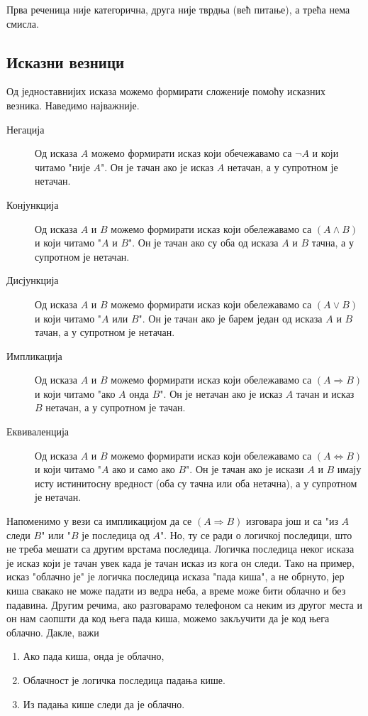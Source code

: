 \documentclass[a4paper]{book}
\begin{document}
Прва реченица није категорична, друга није тврдња (већ питање), а трећа нема смисла.

\subsection{Исказни везници}

\indent

Од једноставнијих исказа можемо формирати сложеније помоћу исказних везника.
На\-ве\-ди\-мо најважније.
\begin{description}
\item[Негација] Од исказа $A$ можемо формирати исказ који обечежавамо са $\lnot A$ и који
читамо "није $A$". Он је тачан ако је исказ $A$ нетачан, а у супротном је нетачан.
\item[Конјункција] Од исказа $A$ и $B$ можемо формирати исказ који обележавамо са $(A\land B)$
и који читамо "$A$ и $B$". Он је тачан ако су оба од исказа $A$ и $B$ тачна, а у супротном је нетачан.
\item[Дисјункција] Од исказа $A$ и $B$ можемо формирати исказ који обележавамо са $(A\lor B)$
и који читамо "$A$ или $B$". Он је тачан ако је барем један од исказа $A$ и $B$ тачан, а у супротном је нетачан.
\item[Импликација] Од исказа $A$ и $B$ можемо формирати исказ који обележавамо са $(A\Rightarrow B)$
и који читамо "ако $A$ онда $B$". Он је нетачан ако је исказ $A$ тачан и исказ $B$ нетачан, а у супротном је тачан.
\item[Еквиваленција] Од исказа $A$ и $B$ можемо формирати исказ који обележавамо са $(A\Leftrightarrow B)$
и који читамо "$A$ ако и само ако $B$". Он је тачан ако је искази $A$ и $B$ имају исту истинитосну вредност
(оба су тачна или оба нетачна), а у супротном је нетачан.
\end{description}

Напоменимо у вези са импликацијом да се $(A\Rightarrow B)$ изговара још и са "из $A$ следи $B$" или
"$B$ је последица од $A$". Но, ту се ради о логичкој последици, што не треба мешати са другим врстама последица.
Логичка последица неког исказа је исказ који је тачан увек када је тачан исказ из кога он следи. Тако на пример,
исказ "облачно је" је логичка последица исказа "пада киша", а не обрнуто, јер киша свакако не може падати из ведра неба,
а време може бити облачно и без падавина. Другим речима, ако разговарамо телефоном са неким из другог места и он нам
саопшти да код њега пада киша, можемо закључити да је код њега облачно. Дакле, важи
\begin{enumerate}
\item
Ако пада киша, онда је облачно,
\item
Облачност је логичка последица падања кише.
\item
Из падања кише следи да је облачно.
\end{enumerate}
\end{document}
